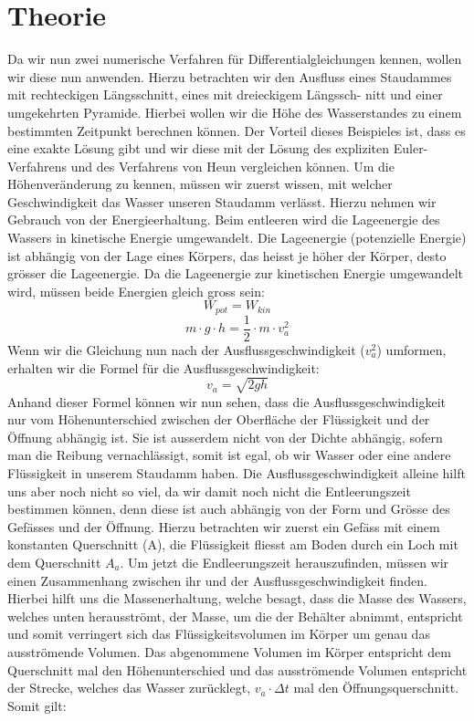 \documentclass[a4paper,12pt]{report}
\begin{document}
\section{Theorie}
Da wir nun zwei numerische Verfahren für Differentialgleichungen kennen, wollen wir diese nun anwenden. Hierzu betrachten wir den Ausfluss eines Staudammes mit rechteckigen Längsschnitt, eines mit dreieckigem Längssch- nitt und einer umgekehrten Pyramide. Hierbei wollen wir die Höhe des Wasserstandes zu einem bestimmten Zeitpunkt berechnen können. Der Vorteil dieses Beispieles ist, dass es eine exakte Lösung gibt und wir diese mit der Lösung des expliziten Euler-Verfahrens und des Verfahrens von Heun vergleichen können. Um die Höhenveränderung zu kennen, müssen wir zuerst wissen, mit welcher Geschwindigkeit das Wasser unseren Staudamm verlässt. Hierzu nehmen wir Gebrauch von der Energieerhaltung. Beim entleeren wird die Lageenergie des Wassers in kinetische Energie umgewandelt. Die Lageenergie (potenzielle Energie) ist abhängig von der Lage eines Körpers, das heisst je höher der Körper, desto grösser die Lageenergie. Da die Lageenergie zur kinetischen Energie umgewandelt wird, müssen beide Energien gleich gross sein:
\begin{equation}
W_{pot} = W_{kin}
\end{equation} 
\begin{equation}
m \cdot g \cdot h = \frac{1}{2} \cdot m \cdot v_a^2
\end{equation} 
Wenn wir die Gleichung nun nach der Ausflussgeschwindigkeit ($v_a^2$) umformen, erhalten wir die Formel für die Ausflussgeschwindigkeit: 
\begin{equation} \label{va}
v_a = \sqrt{2gh}
\end{equation} 
Anhand dieser Formel können wir nun sehen, dass die Ausflussgeschwindigkeit nur vom Höhenunterschied zwischen der Oberfläche der Flüssigkeit und der Öffnung abhängig ist. Sie ist ausserdem nicht von der Dichte abhängig, sofern man die Reibung vernachlässigt, somit ist egal, ob wir Wasser oder eine andere Flüssigkeit in unserem Staudamm haben. Die Ausflussgeschwindigkeit alleine hilft uns aber noch nicht so viel, da wir damit noch nicht die Entleerungszeit bestimmen können, denn diese ist auch abhängig von der Form und Grösse des Gefässes und der Öffnung. Hierzu betrachten wir zuerst ein Gefäss mit einem konstanten Querschnitt (A), die Flüssigkeit fliesst am Boden durch ein Loch mit dem Querschnitt $A_a$. Um jetzt die Endleerungszeit herauszufinden, müssen wir einen Zusammenhang zwischen ihr und der Ausflussgeschwindigkeit finden. Hierbei hilft uns die Massenerhaltung, welche besagt, dass die Masse des Wassers, welches unten herausströmt, der Masse, um die der Behälter abnimmt, entspricht und somit verringert sich das Flüssigkeitsvolumen im Körper um genau das ausströmende Volumen. Das abgenommene Volumen im Körper entspricht dem Querschnitt mal den Höhenunterschied und das ausströmende Volumen entspricht der Strecke, welches das Wasser zurücklegt, $v_a \cdot \Delta t$ mal den Öffnungsquerschnitt. Somit gilt:
\end{document}

